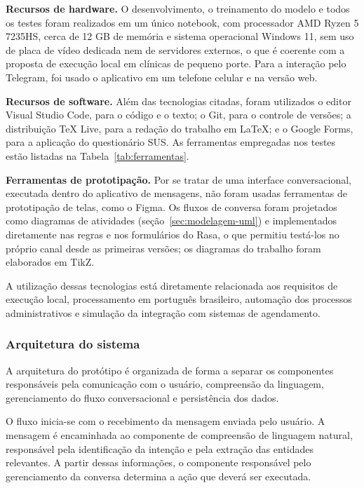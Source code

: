 \documentclass[12pt,a4paper]{extarticle}
\begin{document}
\textbf{Recursos de hardware.} O desenvolvimento, o treinamento do modelo e todos os testes foram realizados em um único notebook, com processador AMD Ryzen 5 7235HS, cerca de 12 GB de memória e sistema operacional Windows 11, sem uso de placa de vídeo dedicada nem de servidores externos, o que é coerente com a proposta de execução local em clínicas de pequeno porte. Para a interação pelo Telegram, foi usado o aplicativo em um telefone celular e na versão web.

\textbf{Recursos de software.} Além das tecnologias citadas, foram utilizados o editor Visual Studio Code, para o código e o texto; o Git, para o controle de versões; a distribuição TeX Live, para a redação do trabalho em \LaTeX; e o Google Forms, para a aplicação do questionário SUS. As ferramentas empregadas nos testes estão listadas na Tabela~\ref{tab:ferramentas}.

\textbf{Ferramentas de prototipação.} Por se tratar de uma interface conversacional, executada dentro do aplicativo de mensagens, não foram usadas ferramentas de prototipação de telas, como o Figma. Os fluxos de conversa foram projetados como diagramas de atividades (seção~\ref{sec:modelagem-uml}) e implementados diretamente nas regras e nos formulários do Rasa, o que permitiu testá-los no próprio canal desde as primeiras versões; os diagramas do trabalho foram elaborados em TikZ.

A utilização dessas tecnologias está diretamente relacionada aos requisitos de execução local, processamento em português brasileiro, automação dos processos administrativos e simulação da integração com sistemas de agendamento.

\subsubsection{Arquitetura do sistema}
\label{sec:arquitetura}

A arquitetura do protótipo é organizada de forma a separar os componentes responsáveis pela comunicação com o usuário, compreensão da linguagem, gerenciamento do fluxo conversacional e persistência dos dados.

O fluxo inicia-se com o recebimento da mensagem enviada pelo usuário. A mensagem é encaminhada ao componente de compreensão de linguagem natural, responsável pela identificação da intenção e pela extração das entidades relevantes. A partir dessas informações, o componente responsável pelo gerenciamento da conversa determina a ação que deverá ser executada.
\end{document}
